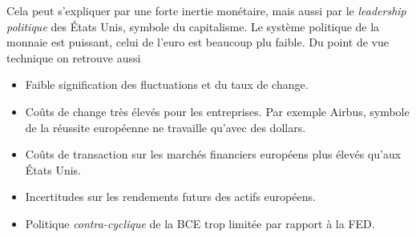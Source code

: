 \documentclass[main.tex]{subfiles}
\begin{document}
        \bigskip

        Cela peut s'expliquer par une forte inertie monétaire, mais aussi par le \emph{leadership politique} des États Unis, symbole du capitalisme. Le système politique de la monnaie est puissant, celui de l'euro est beaucoup plu faible. Du point de vue technique on retrouve aussi
        \begin{itemize}
                \item Faible signification des fluctuations et du taux de change.
                \item Coûts de change très élevés pour les entreprises. Par exemple Airbus, symbole de la réussite européenne ne travaille qu'avec des dollars.
                \item Coûts de transaction sur les marchés financiers européens plus élevés qu'aux États Unis.
                \item Incertitudes sur les rendements futurs des actifs européens.
                \item Politique \emph{contra-cyclique} de la BCE trop limitée par rapport à la FED.
        \end{itemize}
\end{document}
